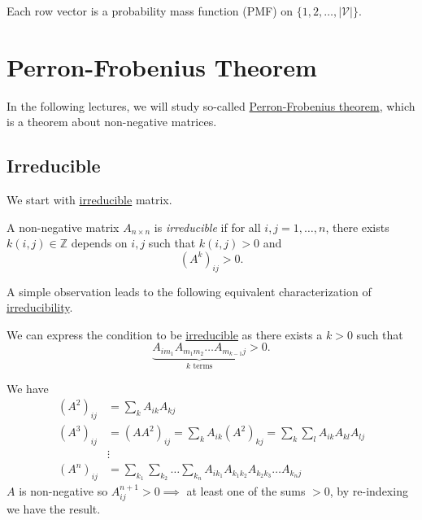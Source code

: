 \begin{remark}
	Each row vector is a probability mass function (PMF) on \(\{1, 2, \ldots , \left\vert \mathcal{V}  \right\vert \}\).
\end{remark}

\section{Perron-Frobenius Theorem}
In the following lectures, we will study so-called \hyperref[thm:Perron-Frobenius-theorem]{Perron-Frobenius theorem}, which is a theorem about non-negative matrices.
\subsection{Irreducible}
We start with \hyperref[def:irreducible]{irreducible} matrix.

\begin{definition}[Irreducible]\label{def:irreducible}
	A non-negative matrix \(A_{n\times n}\) is \emph{irreducible} if for all \(i, j = 1, \ldots , n\), there exists \(k(i, j)\in \mathbb{Z} \)
	depends on \(i, j\) such that \(k(i, j) > 0\) and
	\[
		(A^k)_{ij}>0.
	\]
\end{definition}

A simple observation leads to the following equivalent characterization of \hyperref[def:irreducible]{irreducibility}.

\begin{remark}
	We can express the condition to be \hyperref[def:irreducible]{irreducible} as there exists a \(k > 0\) such that
	\[
		\underbrace{A_{im_1} A_{m_{1}m_2} \ldots A_{m_{k-1}j}}_{k\text{ terms}}>0.
	\]
\end{remark}
\begin{explanation}
	We have
	\[
		\begin{split}
			(A^2)_{ij} &= \sum\limits_{k} A_{ik}A_{kj}\\
			(A^3)_{ij} &= (A A^2)_{ij} = \sum\limits_{k} A_{ik}(A^2)_{kj} = \sum\limits_{k}\sum\limits_{l} A_{ik} A_{kl}A_{lj}\\
			&\vdots\\
			(A^n)_{ij} &= \sum\limits_{k_1}\sum\limits_{k_2}\ldots \sum\limits_{k_n}A_{ik_1}A_{k_1 k_2}A_{k_2 k_3}\ldots A_{k_n j}
		\end{split}
	\]
	\(A\) is non-negative so \(A^{n+1}_{ij} > 0\implies \) at least one of the sums \(>0\), by re-indexing we have the result.
\end{explanation}

